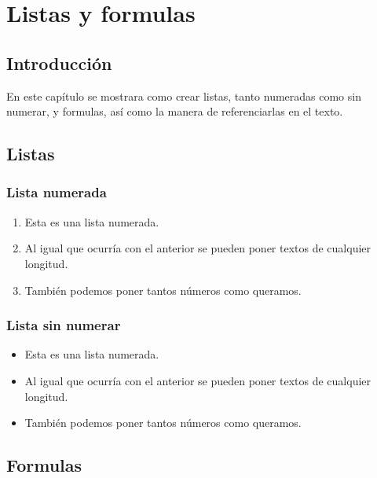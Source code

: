 
\chapter{Listas y formulas}

\thispagestyle{plain}
\renewcommand{\tablename}{Tabla}

\section{Introducción}

En este capítulo se mostrara como crear listas, tanto numeradas como sin numerar, y formulas, así como la manera de referenciarlas en el texto.

\section{Listas}

\subsection{Lista numerada}

\begin{enumerate}
    \item Esta es una lista numerada.
    \item Al igual que ocurría con el anterior se pueden poner textos de cualquier longitud.
    \item También podemos poner tantos números como queramos.
\end{enumerate}

\subsection{Lista sin numerar}

\begin{itemize}
    \item Esta es una lista numerada.
    \item Al igual que ocurría con el anterior se pueden poner textos de cualquier longitud.
    \item También podemos poner tantos números como queramos.
\end{itemize}

\section{Formulas}


